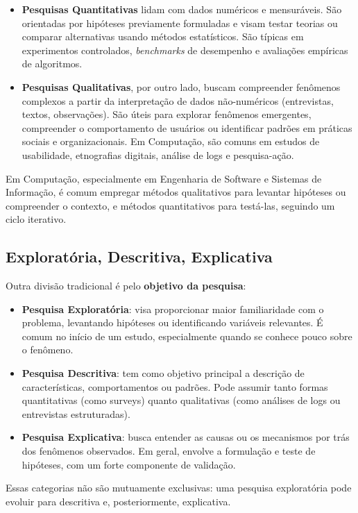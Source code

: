 \begin{itemize}
\item \textbf{Pesquisas Quantitativas} lidam com dados numéricos e mensuráveis. São orientadas por hipóteses previamente formuladas e visam testar teorias ou comparar alternativas usando métodos estatísticos. São típicas em experimentos controlados, \textit{benchmarks} de desempenho e avaliações empíricas de algoritmos.
\item \textbf{Pesquisas Qualitativas}, por outro lado, buscam compreender fenômenos complexos a partir da interpretação de dados não-numéricos (entrevistas, textos, observações). São úteis para explorar fenômenos emergentes, compreender o comportamento de usuários ou identificar padrões em práticas sociais e organizacionais. Em Computação, são comuns em estudos de usabilidade, etnografias digitais, análise de logs e pesquisa-ação.
\end{itemize}

Em Computação, especialmente em Engenharia de Software e Sistemas de Informação, é comum empregar métodos qualitativos para levantar hipóteses ou compreender o contexto, e métodos quantitativos para testá-las, seguindo um ciclo iterativo.

\subsection{Exploratória, Descritiva, Explicativa}

Outra divisão tradicional é pelo \textbf{objetivo da pesquisa}:

\begin{itemize}
\item \textbf{Pesquisa Exploratória}: visa proporcionar maior familiaridade com o problema, levantando hipóteses ou identificando variáveis relevantes. É comum no início de um estudo, especialmente quando se conhece pouco sobre o fenômeno.
\item \textbf{Pesquisa Descritiva}: tem como objetivo principal a descrição de características, comportamentos ou padrões. Pode assumir tanto formas quantitativas (como surveys) quanto qualitativas (como análises de logs ou entrevistas estruturadas).
\item \textbf{Pesquisa Explicativa}: busca entender as causas ou os mecanismos por trás dos fenômenos observados. Em geral, envolve a formulação e teste de hipóteses, com um forte componente de validação.
\end{itemize}

Essas categorias não são mutuamente exclusivas: uma pesquisa exploratória pode evoluir para descritiva e, posteriormente, explicativa.

